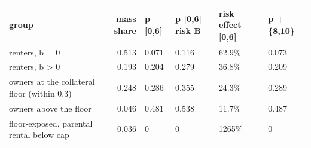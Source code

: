 \begingroup\small
\setlength{\tabcolsep}{3pt}
\renewcommand{\arraystretch}{1.04}
\begin{tabularx}{\linewidth}{XrXXXX}
\toprule
group & mass share & p [0,6] & p [0,6] risk B & risk effect [0,6] & p +\{8,10\} \\
\midrule
renters, b = 0 & 0.513 & 0.071 & 0.116 & 62.9\% & 0.073 \\
renters, b \textgreater{} 0 & 0.193 & 0.204 & 0.279 & 36.8\% & 0.209 \\
owners at the collateral floor (within 0.3) & 0.248 & 0.286 & 0.355 & 24.3\% & 0.289 \\
owners above the floor & 0.046 & 0.481 & 0.538 & 11.7\% & 0.487 \\
floor-exposed, parental rental below cap & 0.036 & 0 & 0 & 1265\% & 0 \\
\bottomrule
\end{tabularx}
\endgroup
